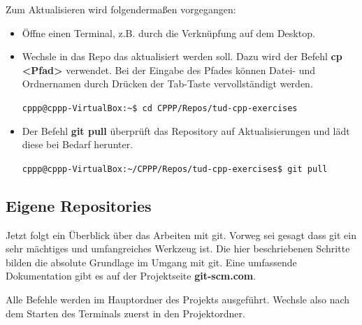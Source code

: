 Zum Aktualisieren wird folgendermaßen vorgegangen:

\begin{itemize}
\item Öffne einen Terminal, z.B. durch die Verknüpfung auf dem Desktop.
\item Wechsle in das Repo das aktualisiert werden soll. Dazu wird der Befehl \textbf{cp <Pfad>} verwendet. Bei der Eingabe des Pfades können Datei- und Ordnernamen durch Drücken der Tab-Taste vervollständigt werden.

\texttt{cppp@cppp-VirtualBox:\textasciitilde\$ cd CPPP/Repos/tud-cpp-exercises}

\item Der Befehl \textbf{git pull} überprüft das Repository auf Aktualisierungen und lädt diese bei Bedarf herunter.

\texttt{cppp@cppp-VirtualBox:\textasciitilde/CPPP/Repos/tud-cpp-exercises\$ git pull}
\end{itemize}

\subsection{Eigene Repositories}
Jetzt folgt ein Überblick über das Arbeiten mit git. Vorweg sei gesagt dass git ein sehr mächtiges und umfangreiches Werkzeug ist. Die hier beschriebenen Schritte bilden die absolute Grundlage im Umgang mit git. Eine umfassende Dokumentation gibt es auf der Projektseite \textbf{git-scm.com}.

Alle Befehle werden im Hauptordner des Projekts ausgeführt. Wechsle also nach dem Starten des Terminals zuerst in den Projektordner.

